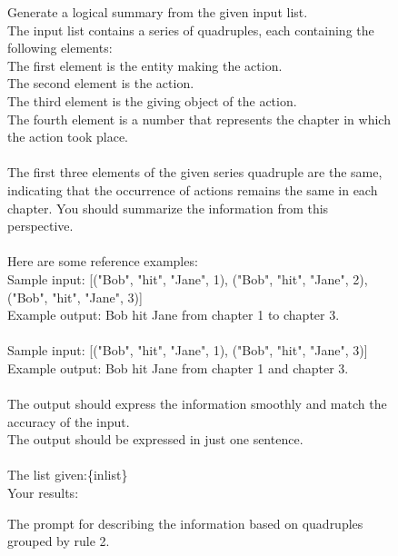 \begin{figure}[htbp]
\centering
\begin{tcolorbox}
Generate a logical summary from the given input list. \\
The input list contains a series of quadruples, each containing the following elements:\\
The first element is the entity making the action.\\
The second element is the action.\\
The third element is the giving object of the action.\\
The fourth element is a number that represents the chapter in which the action took place.\\
\\
The first three elements of the given series quadruple are the same, indicating that the occurrence of actions remains the same in each chapter. You should summarize the information from this perspective.\\
\\
Here are some reference examples:\\
Sample input: [("Bob", "hit", "Jane", 1), ("Bob", "hit", "Jane", 2), ("Bob", "hit", "Jane", 3)]\\
Example output: Bob hit Jane from chapter 1 to chapter 3.\\
\\
Sample input: [("Bob", "hit", "Jane", 1), ("Bob", "hit", "Jane", 3)]\\
Example output: Bob hit Jane from chapter 1 and chapter 3.\\
\\
The output should express the information smoothly and match the accuracy of the input.\\
The output should be expressed in just one sentence.\\
\\
The list given:\{inlist\}\\
Your results:\\
\end{tcolorbox}
\caption{The prompt for describing the information based on quadruples grouped by rule 2.}
\label{tab:group trans2}
\end{figure}



